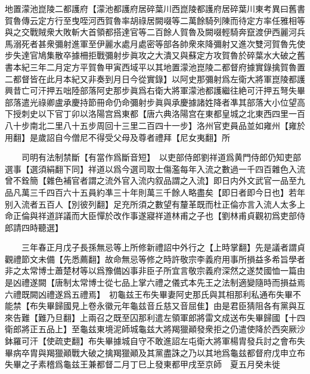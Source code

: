 地置濛池崑陵二都護府【濛池都護府居碎葉川西崑陵都護府居碎葉川東考異曰舊書賀魯傳云定方行至曳咥河西賀魯率胡祿居闕啜等二萬餘騎列陳而待定方率任雅相等與之交戰賊衆大敗斬大首領都搭達官等二百餘人賀魯及闕啜輕騎奔竄渡伊西麗河兵馬溺死者甚衆彌射進軍至伊麗水處月處密等部各帥衆來降彌射又進次雙河賀魯先使步失達官鳩集散卒據柵拒戰彌射步眞攻之大潰又與蘇定方攻賀魯於碎葉水大破之舊書本紀三年二月定方平賀魯甲寅西域平以其地置濛池崑陵二都督府據實錄擒賀魯置二都督皆在此月本紀又非奏到月日今從實錄】以阿史那彌射爲左衛大將軍崑陵都護興昔亡可汗押五咄陸部落阿史那步眞爲右衛大將軍濛池都護繼往絶可汗押五弩失畢部落遣光祿卿盧承慶持節冊命仍命彌射步眞與承慶據諸姓降者凖其部落大小位望高下授刺史以下官丁卯以洛陽宫爲東都【唐六典洛陽宫在東都皇城之北東西四里一百八十步南北二里八十五步周回十三里二百四十一步】洛州官吏員品並如雍州【雍於用翻】是歲詔自今僧尼不得受父母及尊者禮拜【尼女夷翻】所

　　司明有法制禁斷【有當作爲斷音短】　以吏部侍郎劉祥道爲黄門侍郎仍知吏部選事【選須絹翻下同】祥道以爲今選司取士傷濫每年入流之數過一千四百雜色入流曾不銓簡【雜色補官者謂之流外官入流内叙品謂之入流】即日内外文武官一品至九品凡萬三千四百六十五員約凖三十年則萬三千餘人略盡矣【即日者即今日也】若年别入流者五百人【別彼列翻】足充所須之數望有釐革既而杜正倫亦言入流人太多上命正倫與祥道詳議而大臣憚於改作事遂寢祥道林甫之子也【劉林甫貞觀初爲吏部侍郎請四時聽選】

　　三年春正月戊子長孫無忌等上所修新禮詔中外行之【上時掌翻】先是議者謂貞觀禮節文未備【先悉薦翻】故命無忌等修之時許敬宗李義府用事所損益多希旨學者非之太常博士蕭楚材等以爲豫備凶事非臣子所宜言敬宗義府深然之遂焚國恤一篇由是凶禮遂闕【唐制太常博士從七品上掌六禮之儀式本先王之法制適變隨時而損益焉六禮既闕凶禮遂爲五禮焉】　初龜兹王布失畢妻阿史那氏與其相那利私通布失畢不能禁【布失畢歸國見上卷永徽元年龜兹音丘慈又音屈隹】由是君臣猜阻各有黨與互來告難【難乃旦翻】上兩召之既至囚那利遣左領軍郎將雷文成送布失畢歸國【十四衛郎將正五品上】至龜兹東境泥師城龜兹大將羯獵顚發衆拒之仍遣使降於西突厥沙鉢羅可汗【使疏吏翻】布失畢據城自守不敢進詔左屯衛大將軍楊胄發兵討之會布失畢病卒胄與羯獵顚戰大破之擒羯獵顚及其黨盡誅之乃以其地爲龜兹都督府戊申立布失畢之子素稽爲龜兹王兼都督二月丁巳上發東都甲戌至京師　夏五月癸未徙

